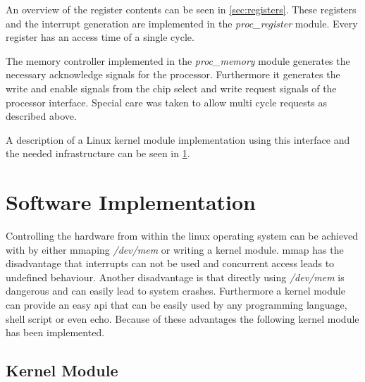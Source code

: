 \documentclass[12pt,a4paper,parskip=full,abstract=true,BCOR=12mm,twoside,open=right]{scrreprt}
\def\device#1{\textit{#1}}
\begin{document}
An overview of the register contents can be seen in \cref{sec:registers}. These
registers and the interrupt generation are implemented in the \device{proc\_register}
module. Every register has an access time of a single cycle.

The memory controller implemented in the \device{proc\_memory} module generates
the necessary acknowledge signals for the processor. Furthermore it generates the
write and enable signals from the chip select and write request signals of the
processor interface. Special care was taken to allow multi cycle requests as
described above.

A description of a Linux kernel module implementation using this interface
and the needed infrastructure can be seen in \cref{chap:software}.


\chapter{Software Implementation}
\label{chap:software}
Controlling the hardware from within the linux operating system can be
achieved with by either mmaping \emph{/dev/mem} or writing a kernel module.
mmap has the disadvantage that interrupts can not be used and concurrent
access leads to undefined behaviour. Another disadvantage is that directly
using \emph{/dev/mem} is dangerous and can easily lead to system crashes.
Furthermore a kernel module can provide an easy api that can be easily
used by any programming language, shell script or even echo. Because of
these advantages the following kernel module has been implemented.

\section{Kernel Module}
\label{sec:kernel_module}
\end{document}
